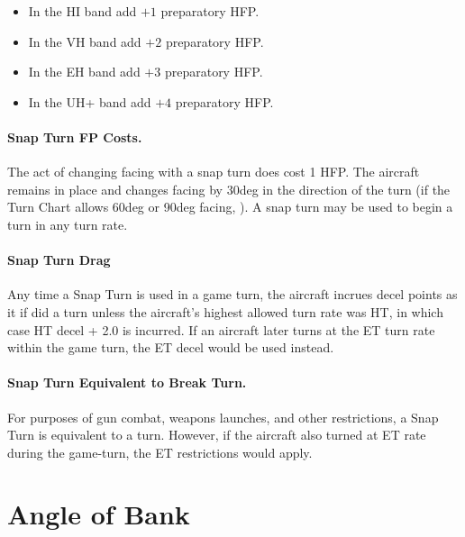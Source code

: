 \begin{advancedrules}
{\begin{itemize}
    \item In the HI band add $+1$ preparatory HFP.
    \item In the VH band add $+2$ preparatory HFP.
    \item In the EH band add $+3$ preparatory HFP.
    \item In the UH+ band add $+4$ preparatory HFP.
\end{itemize}

\paragraph{Snap Turn FP Costs.} The act of changing facing with a snap turn does cost 1 HFP.  The aircraft remains in place and changes facing by 30{deg} in the direction of the turn (if the Turn Chart allows 60{deg} or 90{deg} facing, ). A snap turn may be used to begin a turn in any turn rate.

\paragraph{Snap Turn Drag} Any time a Snap Turn is used in a game turn, the aircraft incrues decel points as it if did a  turn unless the aircraft's highest allowed turn rate was HT, in which case HT decel + 2.0 is incurred. If an aircraft later turns at the ET turn rate within the game turn, the ET decel would be used instead.

\paragraph{Snap Turn Equivalent to Break Turn.} For purposes of gun combat, weapons launches, and other restrictions, a Snap Turn is equivalent to a  turn. However, if the aircraft also turned at ET rate during the game-turn, the ET restrictions would apply.
}

\section{Angle of Bank}
\label{rule:direction-of-bank}


\end{advancedrules}
